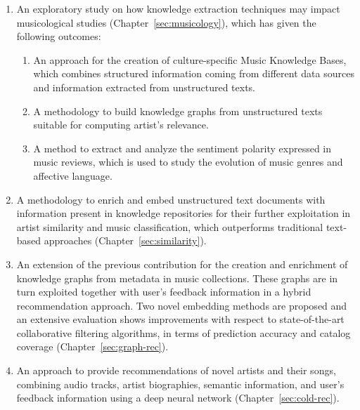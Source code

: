 \begin{enumerate}
\item 
An exploratory study on how knowledge extraction techniques may impact musicological studies (Chapter~\ref{sec:musicology}), which has given the following outcomes:
\begin{enumerate}
\item 
An approach for the creation of culture-specific Music Knowledge Bases, which combines structured information coming from different data sources and information extracted from unstructured texts. 
\item
A methodology to build knowledge graphs from unstructured texts suitable for computing artist's relevance.
\item 
A method to extract and analyze the sentiment polarity expressed in music reviews, which is used to study the evolution of music genres and affective language.
\end{enumerate}

\item 
A methodology to enrich and embed unstructured text documents with information present in knowledge repositories for their further exploitation in artist similarity and music classification, which outperforms traditional text-based approaches (Chapter~\ref{sec:similarity}).

\item
An extension of the previous contribution for the creation and enrichment of knowledge graphs from metadata in music collections. These graphs are in turn exploited together with user's feedback information in a hybrid recommendation approach. Two novel embedding methods are proposed and an extensive evaluation shows improvements with respect to state-of-the-art collaborative filtering algorithms, in terms of prediction accuracy and catalog coverage (Chapter~\ref{sec:graph-rec}).%

\item 
An approach to provide recommendations of novel artists and their songs, combining audio tracks, artist biographies, semantic information, and user's feedback information using a deep neural network (Chapter~\ref{sec:cold-rec}). %


\end{enumerate}
